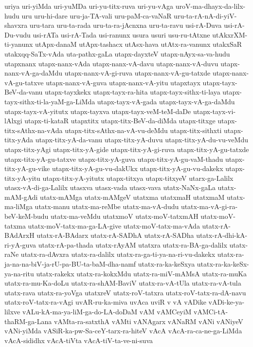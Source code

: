 {uriya
uri-yiMda
uri-yuMDa
uri-yu-titx-ruva
uri-yu-vAga
uroV-ma-dhayx-da-lilx-hudu
uru
uru-hi-dare
uru-ja-TA-vali
uru-paM-ca-vaNaR
uru-ta-rA-nA-di-yiV-shavxra
uru-tara
uru-ta-rada
uru-ta-ra-jAcnxna
uru-ta-ravu
usi-rA-Duva
usi-rA-Du-vudu
usi-rATa
usi-rA-Tada
usi-ranunx
usura
usuri
usu-ru-tAtxne
utAkxrXM-ti-yanunx
utApx-danaM
utApx-tashacx
utAsx-hava
utAtx-ra-vanunx
utakxSaR
utakxqq-SaTx-vAda
uta-pathx-gaLa
utapx-dayxteV
utapx-nAyx-sa-va-hudu
utapxnanx
utapx-nanx-vAda
utapx-nanx-vA-davu
utapx-nanx-vA-duvu
utapx-nanx-vA-ga-daMdu
utapx-nanx-vA-gi-ruva
utapx-nanx-vA-gu-tatxde
utapx-nanx-vA-gu-tatxve
utapx-nanx-vA-guva
utapx-nanx-vA-yitu
utapxtayx
utapx-tayx-BeV-da-vanu
utapx-tayxkekx
utapx-tayx-ra-hita
utapx-tayx-sithx-ti-laya
utapx-tayx-sithx-ti-la-yaM-ga-LiMda
utapx-tayx-vA-gada
utapx-tayx-vA-ga-daMdu
utapx-tayx-vA-yitutx
utapx-tayxva
utapx-tayx-veM-teM-daDe
utapx-tayx-vi-lAlxgi
utapx-ti-kataR
utapxtitx
utapx-titx-BeV-da-diMda
utapx-titxge
utapx-titx-sAthx-na-vAda
utapx-titx-sAthx-na-vA-vu-deMdu
utapx-titx-sithxti
utapx-titx-yAda
utapx-titx-yA-da-vanu
utapx-titx-yA-duvu
utapx-titx-yA-du-vu-veMdu
utapx-titx-yAgi
utapx-titx-yA-gide
utapx-titx-yA-gi-ruva
utapx-titx-yA-gu-tatxde
utapx-titx-yA-gu-tatxve
utapx-titx-yA-guva
utapx-titx-yA-gu-vaM-thadu
utapx-titx-yA-gu-vike
utapx-titx-yA-gu-vu-dakUkx
utapx-titx-yA-gu-vu-dakekx
utapx-titx-yA-yitu
utapx-titx-yA-yitutx
utapx-titxya
utapx-titxyeV
utarx-ga-Lalilx
utasx-vA-di-ga-Lalilx
utasxva
utasx-vada
utasx-vava
utatx-NaNx-gaLa
utatx-mAM-gAdi
utatx-mAMga
utatx-mAMgeV
utatxma
utatxmaH
utatxmaM
utatx-ma-liMga
utatx-manu
utatx-ma-reMbe
utatx-ma-vA-dudu
utatx-ma-vA-gi-ra-beV-keM-budu
utatx-ma-veMdu
utatxmoV
utatx-moV-tatxmAH
utatx-moV-tatxma
utatx-moV-tatx-ma-ga-LA-give
utatx-moV-tatx-ma-vAda
utatx-rA-BAdArxH
utatx-rA-BAdarx
utatx-rA-SADhA
utatx-rA-SADha
utatx-rA-dhi-kA-ri-yA-guva
utatx-rA-pa-thada
utatx-rAyAM
utatxra
utatx-ra-BA-ga-dalilx
utatx-raNe
utatx-ra-dAvxra
utatx-ra-dalilx
utatx-ra-ga-ti-ya-na-ri-vu-dakekx
utatx-ra-ja-na-na-biV-ja-rU-pa-BU-ta-baM-dha-namf
utatx-ra-ka-keSxya
utatx-ra-ka-keSx-ya-na-ritu
utatx-rakekx
utatx-ra-kokxMdu
utatx-ra-miV-mAMsA
utatx-ra-muKa
utatx-ra-mu-Ka-doLu
utatx-ra-shAM-BaviV
utatx-ra-vA-tUla
utatx-ra-vA-tula
utatx-rava
utatx-ra-yoVga
utatxreV
utatx-roV-tatxra
utatx-roV-tatx-ra-dA-navu
utatx-roV-tatx-ra-vAgi
uvAR-ru-ka-miva
uvAca
uviR
v
vA
vADike
vADi-ke-ya-lilxve
vALu-kA-ma-ya-liM-ga-do-LA-doDaM
vAM
vAMCeyiM
vAMCi-tA-thaRM-ga-Lana
vAMta-ra-satxthA
vAMti
vANAgarx
vANaRM
vANi
vANiyeV
vANi-yiMda
vASiR-ka-pw-Sa-ceY-tarx-ra-hiteV
vAcA
vAcA-ra-ca-ne-ga-LiMda
vAcA-sididhx
vAcA-tiVta
vAcA-tiV-ta-ve-ni-suva
}
